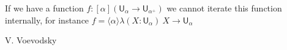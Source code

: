 \documentclass[10pt,a4paper]{article}
\newcommand{\lam}[2]{{\langle}#1{\rangle}#2}
\def\UU{\mathsf{U}}
\begin{document}
If we have a function $f:[\alpha](\UU_{\alpha}\rightarrow \UU_{\alpha^+})$ we cannot iterate
this function internally, for instance  $f = \lam{\alpha}{\lambda (X:\UU_{\alpha})~X\rightarrow\UU_{\alpha}}$









\begin{thebibliography}{9}

  V. Voevodsky












\end{thebibliography}
\end{document}
